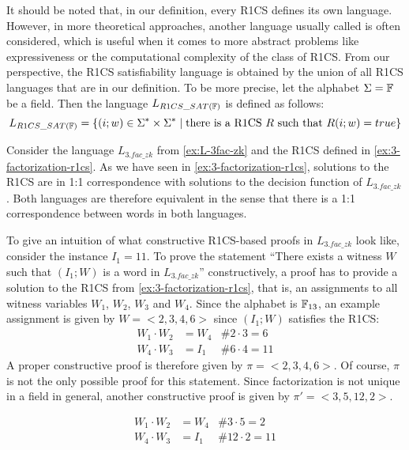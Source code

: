 \begin{remark}[R1CS satisfiability]\label{r1cs-satisfiability}  It should be noted that, in our definition, every R1CS defines its own language. However,  in more theoretical approaches, another language usually called  is often considered, which is useful when it comes to more abstract problems like expressiveness or the computational complexity of the class of  R1CS. From our perspective, the R1CS satisfiability language is obtained by the union of all R1CS languages that are in our definition. To be more precise, let the alphabet $\Sigma=\mathbb{F}$ be a field. Then the language $L_{R1CS\_SAT(\mathbb{F})}$ is defined as follows:
$$
L_{R1CS\_SAT(\mathbb{F})} = \{(i;w)\in \Sigma^*\times \Sigma^*\;|\; \text{there is a R1CS $R$ such that } R(i;w)=true  \}
$$
\end{remark}
\begin{example}[3-Factorization]
\label{ex:3-fac-R1CS-constr-proof}
Consider the language $L_{3.fac\_zk}$ from \examplename{} \ref{ex:L-3fac-zk} and the R1CS defined in \examplename{} \ref{ex:3-factorization-r1cs}. As we have seen in \ref{ex:3-factorization-r1cs}, solutions to the R1CS are in 1:1 correspondence with solutions to the decision function of $L_{3.fac\_zk}$. Both languages are therefore equivalent in the sense that there is a 1:1 correspondence between words in both languages.

To give an intuition of what constructive R1CS-based proofs in $L_{3.fac\_zk}$ look like, consider the instance $I_1= 11$. To prove the statement ``There exists a witness $W$ such that $(I_1;W)$ is a word in $L_{3.fac\_zk}$'' constructively, a proof has to provide a solution to the R1CS from \examplename{} \ref{ex:3-factorization-r1cs}, that is, an assignments to all witness variables $W_1$, $W_2$, $W_3$ and $W_4$. Since the alphabet is $\mathbb{F}_{13}$, an example assignment is given by
$W=<2,3,4,6>$ since $(I_1;W)$ satisfies the R1CS:
\begin{align*}
W_1 \cdot W_2 &= W_4 & \text{\# } 2\cdot 3 = 6\\
W_4 \cdot W_3 &= I_1 & \text{\# } 6\cdot 4 = 11
\end{align*}
A proper constructive proof is therefore given by $\pi=<2,3,4,6>$. Of course, $\pi$ is not the only possible proof for this statement. Since factorization is not unique in a field in general, another constructive proof is given by $\pi'=<3,5,12,2>$. 

\begin{align*}
W_1 \cdot W_2 &= W_4 & \text{\# } 3\cdot 5 = 2\\
W_4 \cdot W_3 &= I_1 & \text{\# } 12\cdot 2 = 11
\end{align*}

\end{example}

